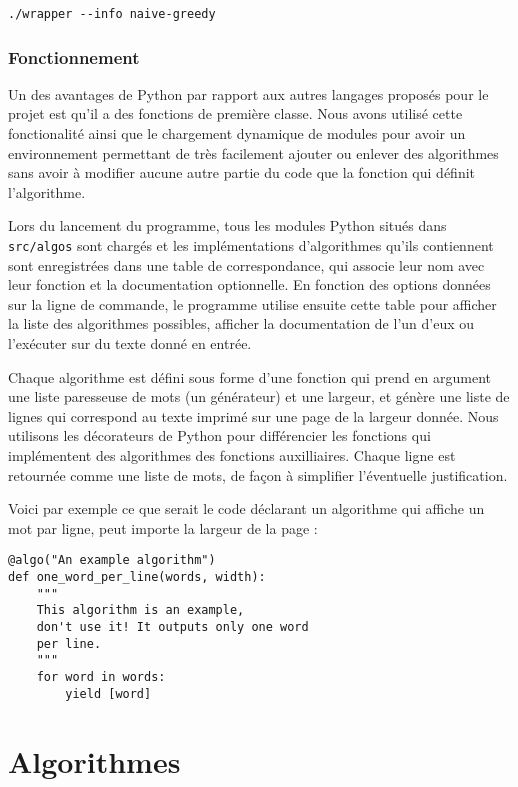 \documentclass[a4paper, 11pt]{article}
\begin{document}
\begin{verbatim}
./wrapper --info naive-greedy
\end{verbatim}

\section{Fonctionnement}

Un des avantages de Python par rapport aux autres langages proposés pour le
projet est qu'il a des fonctions de première classe. Nous avons utilisé cette
fonctionalité ainsi que le chargement dynamique de modules pour avoir un
environnement permettant de très facilement ajouter ou enlever des algorithmes
sans avoir à modifier aucune autre partie du code que la fonction qui définit
l'algorithme.

Lors du lancement du programme, tous les modules Python situés dans
\verb|src/algos| sont chargés et les implémentations d'algorithmes qu'ils
contiennent sont enregistrées dans une table de correspondance, qui associe leur
nom avec leur fonction et la documentation optionnelle. En fonction
des options données sur la ligne de commande, le programme utilise ensuite cette
table pour afficher la liste des algorithmes possibles, afficher la
documentation de l'un d'eux ou l'exécuter sur du texte donné en entrée.

Chaque algorithme est défini sous forme d'une fonction qui prend en argument une
liste paresseuse de mots (un générateur) et une largeur, et génère une liste
de lignes qui correspond au texte imprimé sur une page de la largeur donnée.
Nous utilisons les décorateurs de Python pour différencier les fonctions qui
implémentent des algorithmes des fonctions auxilliaires. Chaque ligne est
retournée comme une liste de mots, de façon à simplifier l'éventuelle
justification.

Voici par exemple ce que serait le code déclarant un algorithme qui affiche un
mot par ligne, peut importe la largeur de la page :

\begin{verbatim}
@algo("An example algorithm")
def one_word_per_line(words, width):
    """
    This algorithm is an example,
    don't use it! It outputs only one word
    per line.
    """
    for word in words:
        yield [word]
\end{verbatim}

\part{Algorithmes}
\end{document}
